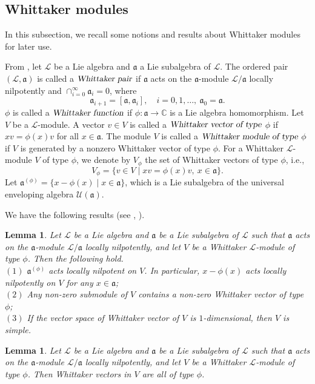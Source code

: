 \documentclass[12pt, a4paper]{amsart}
\newcommand{\C}{\mathbb{C}}
\newcommand{\U}{\mathcal{U}}
\theoremstyle{Theorem}
\theoremstyle{Theorem}
\newtheorem{lemma}[thm]{Lemma}
\numberwithin{equation}{section}
\begin{document}
\subsection{Whittaker modules}
In this subsection, we recall some notions and results about Whittaker modules for later use.


From \cite{BM}, let $\mathcal{L}$ be a Lie algebra and $\mathfrak{a}$ a Lie subalgebra of $\mathcal{L}$.
The ordered pair $(\mathcal{L},\mathfrak{a})$ is called a $\textsl{Whittaker pair}$ if
$\mathfrak{a}$ acts on the $\mathfrak{a}$-module $\mathcal{L}/\mathfrak{a}$ locally nilpotently and  $\cap_{i=0}^{\infty}\mathfrak{a}_{i}=0$, where
\[\mathfrak{a}_{i+1}=[\mathfrak{a},\mathfrak{a}_{i}],\quad i=0,1,\dots,\ \mathfrak{a}_{0}=\mathfrak{a}.\]
$\phi$ is called a $\textsl{Whittaker function}$ if $\phi:\mathfrak{a}\rightarrow\C$ is a Lie algebra homomorphism.
Let $V$ be a $\mathcal{L}$-module.
A vector $v\in V$ is called a $\textsl{Whittaker vector of type}$ $\phi$ if $xv=\phi(x)v$ for all $x\in\mathfrak{a}$.
The module $V$ is called a $\textsl{Whittaker module of type}$ $\phi$
if $V$ is generated by a nonzero Whittaker vector of type $\phi$. For a Whittaker $\mathcal{L}$-module $V$ of type
$\phi$, we denote by $V_{\phi}$ the set of Whittaker vectors of type $\phi$, i.e.,
\[V_{\phi}=\{v\in V\mid xv=\phi(x)v,\ x\in\mathfrak{a}\}.\]
Let $\mathfrak{a}^{(\phi)}=\{x-\phi(x)\mid x\in \mathfrak{a}\}$,
which is a Lie subalgebra of the universal enveloping algebra $\U(\mathfrak{a})$.

We have the following results (see \cite{ALZ}, \cite{CJ}).
\begin{lemma}\label{ALZ}
Let $\mathcal{L}$ be a Lie algebra
and $\mathfrak{a}$ be a Lie subalgebra of $\mathcal{L}$ such that $\mathfrak{a}$ acts on the $\mathfrak{a}$-module $\mathcal{L}/\mathfrak{a}$ locally nilpotently,
and let $V$ be a Whittaker $\mathcal{L}$-module of type $\phi$. Then the following hold.\\
$(1)$ $\mathfrak{a}^{(\phi)}$ acts locally nilpotent on $V$.
In particular, $x-\phi(x)$ acts locally nilpotently on $V$ for any $x\in\mathfrak{a}$;\\
$(2)$ Any non-zero submodule of $V$ contains a non-zero Whittaker vector of type $\phi$;\\
$(3)$ If the vector space of Whittaker vector of $V$ is $1$-dimensional, then $V$ is simple.
\end{lemma}


\begin{lemma}\label{CJ}
Let $\mathcal{L}$ be a Lie algebra and $\mathfrak{a}$
be a Lie subalgebra of $\mathcal{L}$ such that $\mathfrak{a}$ acts
on the $\mathfrak{a}$-module $\mathcal{L}/\mathfrak{a}$ locally nilpotently,
and let $V$ be a Whittaker $\mathcal{L}$-module of type $\phi$. Then Whittaker vectors in $V$ are all of type $\phi$.
\end{lemma}
\end{document}
